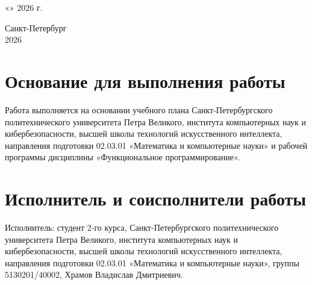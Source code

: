 \documentclass[a4paper, 14pt]{extarticle} %
\begin{document}
\begin{titlepage}
        \vspace{1cm}
        
        \begin{flushright}
            \large
            «\underline{\hspace{1cm}}» \underline{\hspace{3cm}} 2026 г.
        \end{flushright}
        
        \vspace{0.5cm}
        
        \vfill
        
        \begin{center}
            Санкт-Петербург \\
            2026
        \end{center}   
            
    \end{titlepage}
    
    \setcounter{page}{2}  
    \newpage
    \section{Основание для выполнения работы}
        Работа выполняется на основании учебного плана Санкт-Петербургского политехнического университета Петра Великого, института компьютерных наук и кибербезопасности, высшей школы технологий искусственного интеллекта, направления подготовки 02.03.01 «Математика и компьютерные науки» и рабочей программы дисциплины «Функциональное программирование».

    \section{Исполнитель и соисполнители работы}   
        Исполнитель: студент 2-го курса, Санкт-Петербургского политехнического университета Петра Великого, института компьютерных наук и кибербезопасности, высшей школы технологий искусственного интеллекта, направления подготовки 02.03.01 «Математика и компьютерные науки», группы 5130201/40002, Храмов Владислав Дмитриевич.
        
\end{document}
